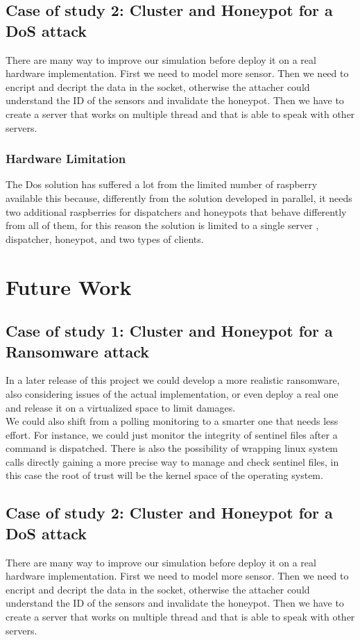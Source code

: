 \subsection{Case of study 2: Cluster and Honeypot for a DoS attack}

There are many way to improve our simulation before deploy it on a real hardware implementation. First we need to model more sensor. Then we need to encript and decript the data in the socket, otherwise the attacher could understand the ID of the sensors and invalidate the honeypot. Then we have to create a server that works on multiple thread and that is able to speak with other servers.

\subsubsection{Hardware Limitation}

The Dos solution has suffered a lot from the limited number of raspberry available this because, differently from the solution developed in parallel, it needs two additional raspberries for dispatchers and honeypots that behave differently from all of them, for this reason the solution is limited to a single server , dispatcher, honeypot, and two types of clients.

\section{Future Work}

\subsection{Case of study 1: Cluster and Honeypot for a Ransomware attack}

In a later release of this project we could develop a more realistic ransomware, also considering issues of the actual implementation, or even deploy a real one and release it on a virtualized space to limit damages.\\
We could also shift from a polling monitoring to a smarter one that needs less effort. For instance, we could just monitor the integrity of sentinel files after a command is dispatched. There is also the possibility of wrapping linux system calls directly gaining a more precise way to manage and check sentinel files, in this case the root of trust will be the kernel space of the operating system.

\subsection{Case of study 2: Cluster and Honeypot for a DoS attack}
There are many way to improve our simulation before deploy it on a real hardware implementation. First we need to model more sensor. Then we need to encript and decript the data in the socket, otherwise the attacher could understand the ID of the sensors and invalidate the honeypot. Then we have to create a server that works on multiple thread and that is able to speak with other servers. 